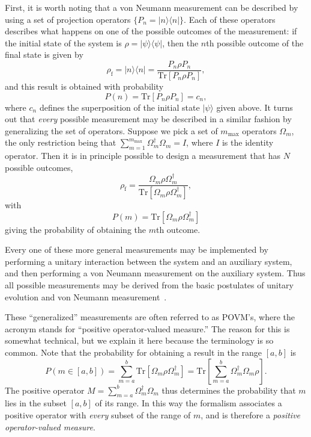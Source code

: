 \documentclass[12pt,aps,onecolum,superscriptaddress,footinbib,floatfix,showpacs]{revtex4-1}
\def\ket#1{|{#1}\rangle}
\begin{document}
First, it is worth noting that a von Neumann measurement can be
described by using a set of projection operators $\{P_n = |n\rangle\langle n
|\}$. Each of these operators describes what happens on one of the
possible outcomes of the measurement: 
if the initial state of the system is $\rho
= |\psi\rangle\langle\psi| $, 
then the $n$th possible outcome of the final state is 
given by
\begin{equation}
   \rho_\mathrm{f} 
     = |n\rangle\langle n|
     = \frac{P_n \rho P_n}{\mathrm{Tr}[P_n \rho P_n]},
\end{equation}
and this result is obtained with probability
\begin{equation}
  P(n) = \mbox{Tr}[P_n\rho P_n] = c_n ,
\end{equation}
where $c_n$ defines the superposition of the initial state
$\ket\psi$ given above.
It turns out that \textit{every} possible measurement may be described in a
similar fashion by generalizing the set of operators. 
Suppose we pick a set of $m_\mathrm{max}$ 
operators $\Omega_m$, the
only restriction being that $\sum_{m=1}^{m_\mathrm{max}} \Omega_m^\dagger\Omega_m
= I$, where $I$ is the identity operator. 
Then it is in principle possible to design a measurement
that has $N$ possible outcomes, 
\begin{equation}
   \rho_\mathrm{f} = \frac{\Omega_m \rho \Omega_m^\dagger }
        {\mathrm{Tr}[\Omega_m \rho \Omega_m^\dagger ]},
\end{equation}
with
\begin{equation}
 P(m) = \mathrm{Tr}[\Omega_m \rho \Omega_m^\dagger ]
\end{equation}
giving the probability of obtaining the $m$th outcome.

Every one of these more general measurements may be implemented by
performing a unitary interaction between the system and an
auxiliary system, and then performing a von Neumann measurement on
the auxiliary system. Thus all possible measurements may be
derived from the basic postulates of unitary evolution and von 
Neumann measurement~\cite{Schumacher96,mikeandike}. 

These ``generalized'' measurements are often referred to as  
POVM's, where the acronym stands for ``positive operator-valued measure.'' 
The reason for this is somewhat technical, but we explain it here because 
the terminology is so common. Note that the probability for obtaining 
a result in the range $[a,b]$ is 
\begin{equation}
  P(m\in [a,b]) = \sum_{m=a}^{b}\mbox{Tr}\left[\Omega_m\rho  \Omega_m^\dagger\right] = \mbox{Tr}\left[\sum_{m=a}^{b} \Omega_m^\dagger\Omega_m\rho\right]  .
\end{equation}
The positive operator $M = \sum_{m=a}^{b}\Omega_m^\dagger\Omega_m$ thus 
determines the probability that $m$ lies in the subset $[a,b]$ of its range. In this way 
the formalism associates a positive operator with {\em every} subset of the 
range of $m$, and is therefore a {\em positive operator-valued measure}.
\end{document}
